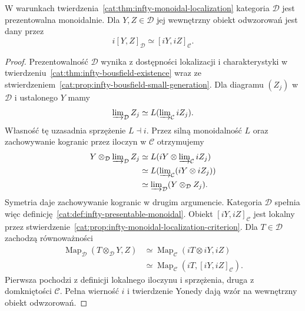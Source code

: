 \begin{wniosek}\label{cat:cor:infty-monoidal-localization-closed}
W warunkach twierdzenia~\ref{cat:thm:infty-monoidal-localization} kategoria $\mathcal D$ jest prezentowalna monoidalnie. Dla $Y,Z\in\mathcal D$ jej wewnętrzny obiekt odwzorowań jest dany przez
\[
 i[Y,Z]_{\mathcal D}\simeq [iY,iZ]_{\mathcal C}.
\]
\end{wniosek}
\begin{proof}
Prezentowalność $\mathcal D$ wynika z dostępności lokalizacji i charakterystyki w twierdzeniu~\ref{cat:thm:infty-bousfield-existence} wraz ze stwierdzeniem~\ref{cat:prop:infty-bousfield-small-generation}. Dla diagramu $(Z_j)$ w $\mathcal D$ i ustalonego $Y$ mamy
\[
 \varinjlim\nolimits_{\mathcal D} Z_j\simeq
 L(\varinjlim\nolimits_{\mathcal C}iZ_j).
\]
Własność tę uzasadnia sprzężenie $L\dashv i$. Przez silną monoidalność $L$ oraz zachowywanie kogranic przez iloczyn w $\mathcal C$ otrzymujemy
\[
\begin{aligned}
 Y\otimes_{\mathcal D}\varinjlim\nolimits_{\mathcal D}Z_j
 &\simeq L(iY\otimes\varinjlim\nolimits_{\mathcal C}iZ_j)\\
 &\simeq L(\varinjlim\nolimits_{\mathcal C}(iY\otimes iZ_j))\\
 &\simeq \varinjlim\nolimits_{\mathcal D}(Y\otimes_{\mathcal D}Z_j).
\end{aligned}
\]
Symetria daje zachowywanie kogranic w drugim argumencie. Kategoria $\mathcal D$ spełnia więc definicję~\ref{cat:def:infty-presentable-monoidal}. Obiekt $[iY,iZ]_{\mathcal C}$ jest lokalny przez stwierdzenie~\ref{cat:prop:infty-monoidal-localization-criterion}. Dla $T\in\mathcal D$ zachodzą równoważności
\[
\begin{aligned}
 \operatorname{Map}_{\mathcal D}(T\otimes_{\mathcal D}Y,Z)
 &\simeq\operatorname{Map}_{\mathcal C}(iT\otimes iY,iZ)\\
 &\simeq\operatorname{Map}_{\mathcal C}(iT,[iY,iZ]_{\mathcal C}).
\end{aligned}
\]
Pierwsza pochodzi z definicji lokalnego iloczynu i sprzężenia, druga z domkniętości $\mathcal C$. Pełna wierność $i$ i twierdzenie Yonedy dają wzór na wewnętrzny obiekt odwzorowań.
\end{proof}

